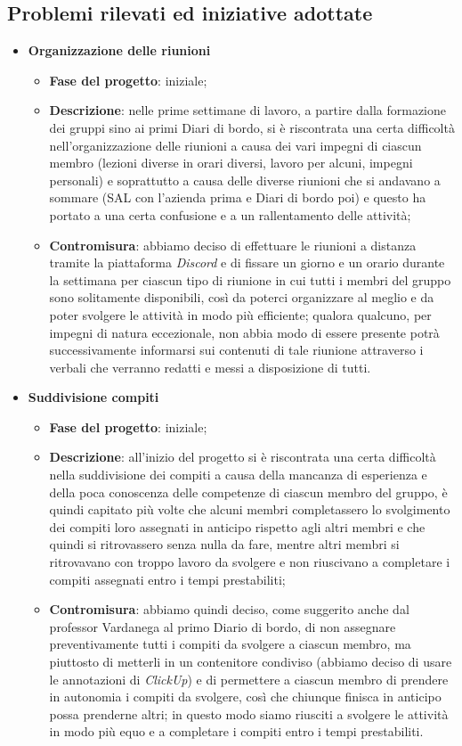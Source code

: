 \subsection{Problemi rilevati ed iniziative adottate}
\begin{itemize}
    \item \textbf{Organizzazione delle riunioni}
    \begin{itemize}
        \item \textbf{Fase del progetto}: iniziale;
        \item \textbf{Descrizione}: nelle prime settimane di lavoro, a partire dalla formazione dei gruppi sino ai primi Diari di bordo, si è riscontrata una certa difficoltà nell'organizzazione delle riunioni a causa dei vari impegni di ciascun membro (lezioni diverse in orari diversi, lavoro per alcuni, impegni personali) e soprattutto a causa delle diverse riunioni che si andavano a sommare (SAL con l'azienda prima e Diari di bordo poi) e questo ha portato a una certa confusione e a un rallentamento delle attività;
        \item \textbf{Contromisura}: abbiamo deciso di effettuare le riunioni a distanza tramite la piattaforma \textit{Discord} e di fissare un giorno e un orario durante la settimana per ciascun tipo di riunione in cui tutti i membri del gruppo sono solitamente disponibili, così da poterci organizzare al meglio e da poter svolgere le attività in modo più efficiente; qualora qualcuno, per impegni di natura eccezionale, non abbia modo di essere presente potrà successivamente informarsi sui contenuti di tale riunione attraverso i verbali che verranno redatti e messi a disposizione di tutti.
    \end{itemize}
    \item \textbf{Suddivisione compiti}
    \begin{itemize}
        \item \textbf{Fase del progetto}: iniziale;
        \item \textbf{Descrizione}: all'inizio del progetto si è riscontrata una certa difficoltà nella suddivisione dei compiti a causa della mancanza di esperienza e della poca conoscenza delle competenze di ciascun membro del gruppo, è quindi capitato più volte che alcuni membri completassero lo svolgimento dei compiti loro assegnati in anticipo rispetto agli altri membri e che quindi si ritrovassero senza nulla da fare, mentre altri membri si ritrovavano con troppo lavoro da svolgere e non riuscivano a completare i compiti assegnati entro i tempi prestabiliti;
        \item \textbf{Contromisura}: abbiamo quindi deciso, come suggerito anche dal professor Vardanega al primo Diario di bordo, di non assegnare preventivamente tutti i compiti da svolgere a ciascun membro, ma piuttosto di metterli in un contenitore condiviso (abbiamo deciso di usare le annotazioni di \textit{ClickUp}) e di permettere a ciascun membro di prendere in autonomia i compiti da svolgere, così che chiunque finisca in anticipo possa prenderne altri; in questo modo siamo riusciti a svolgere le attività in modo più equo e a completare i compiti entro i tempi prestabiliti.
    \end{itemize}
\end{itemize}

